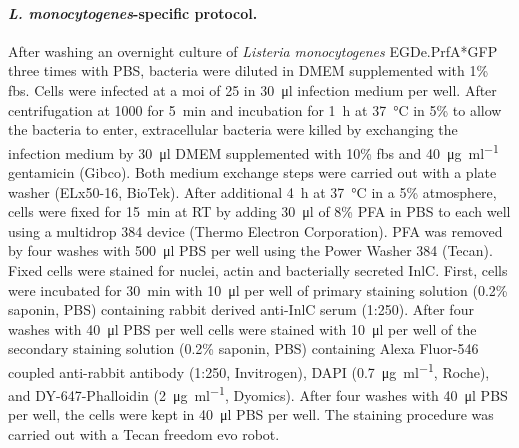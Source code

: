 \paragraph{\textit{L. monocytogenes}-specific protocol.}
After washing an overnight culture of \textit{Listeria monocytogenes} EGDe.PrfA*GFP three times with PBS, bacteria were diluted in DMEM supplemented with 1\% \gls{fbs}. Cells were infected at a \gls{moi} of 25 in \SI{30}{\micro\litre} infection medium per well. After centrifugation at \SI{1000}{\rpm} for \SI{5}{\minute} and incubation for \SI{1}{\hour} at \SI{37}{\celsius} in 5\%  to allow the bacteria to enter, extracellular bacteria were killed by exchanging the infection medium by \SI{30}{\micro\litre} DMEM supplemented with 10\% \gls{fbs} and \SI{40}{\micro\gram\per\milli\litre} gentamicin (Gibco). Both medium exchange steps were carried out with a plate washer (ELx50-16, BioTek). After additional \SI{4}{\hour} at \SI{37}{\celsius} in a 5\%  atmosphere, cells were fixed for \SI{15}{\minute} at RT by adding \SI{30}{\micro\litre} of 8\% PFA in PBS to each well using a multidrop 384 device (Thermo Electron Corporation). PFA was removed by four washes with \SI{500}{\micro\litre} PBS per well using the Power Washer 384 (Tecan). Fixed cells were stained for nuclei, actin and bacterially secreted InlC. First, cells were incubated for \SI{30}{\minute} with \SI{10}{\micro\litre} per well of primary staining solution (0.2\% saponin, PBS) containing rabbit derived anti-InlC serum (1:250). After four washes with \SI{40}{\micro\litre} PBS per well cells were stained with \SI{10}{\micro\litre} per well of the secondary staining solution (0.2\% saponin, PBS) containing Alexa Fluor-546 coupled anti-rabbit antibody (1:250, Invitrogen), DAPI (\SI{0.7}{\micro\gram\per\milli\litre}, Roche), and DY-647-Phalloidin (\SI{2}{\micro\gram\per\milli\litre}, Dyomics). After four washes with \SI{40}{\micro\litre} PBS per well, the cells were kept in \SI{40}{\micro\litre} PBS per well. The staining procedure was carried out with a Tecan freedom evo robot.

